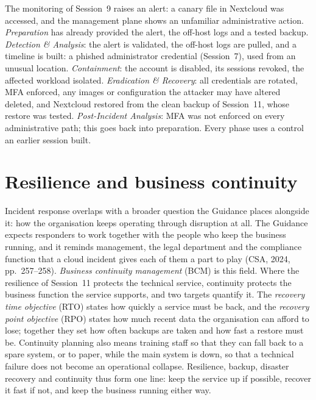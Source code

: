 \begin{example}\label{ex:ir-trc}
The monitoring of Session~9 raises an alert: a canary file in Nextcloud was
accessed, and the management plane shows an unfamiliar administrative action.
\emph{Preparation} has already provided the alert, the off-host logs and a
tested backup. \emph{Detection \& Analysis}: the alert is validated, the
off-host logs are pulled, and a timeline is built: a phished administrator
credential (Session~7), used from an unusual location. \emph{Containment}: the
account is disabled, its sessions revoked, the affected workload isolated.
\emph{Eradication \& Recovery}: all credentials are rotated, MFA enforced, any
images or configuration the attacker may have altered deleted, and Nextcloud
restored from the clean backup of Session~11, whose restore was tested.
\emph{Post-Incident Analysis}: MFA was not enforced on every administrative
path; this goes back into preparation. Every phase uses a control an earlier
session built.
\end{example}

\section{Resilience and business continuity}

Incident response overlaps with a broader question the Guidance places
alongside it: how the organisation keeps operating through disruption at
all. The Guidance expects responders to work together with the people who
keep the business running, and it reminds management, the legal department
and the compliance function that a cloud incident gives each of them a part
to play (CSA, 2024, pp.~257--258). \emph{Business continuity management}
(BCM) is this field. Where the resilience of Session~11 protects the
technical service, continuity protects the business function the service
supports, and two targets quantify it. The \emph{recovery time objective}
(RTO) states how quickly a service must be back, and the \emph{recovery
point objective} (RPO) states how much recent data the organisation can
afford to lose; together they set how often backups are taken and how fast
a restore must be. Continuity planning also means training staff so that
they can fall back to a spare system, or to paper, while the main system is
down, so that a technical failure does not become an operational collapse.
Resilience, backup, disaster recovery and continuity thus form one line:
keep the service up if possible, recover it fast if not, and keep the
business running either way.

